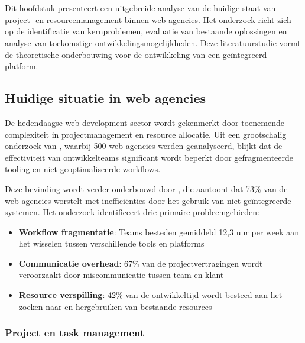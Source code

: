 \chapter{}
\label{ch:stand-van-zaken}

Dit hoofdstuk presenteert een uitgebreide analyse van de huidige staat van project- en resourcemanagement binnen web agencies. Het onderzoek richt zich op de identificatie van kernproblemen, evaluatie van bestaande oplossingen en analyse van toekomstige ontwikkelingsmogelijkheden. Deze literatuurstudie vormt de theoretische onderbouwing voor de ontwikkeling van een geïntegreerd platform.

\section{Huidige situatie in web agencies}
\label{sec:huidige-situatie}

De hedendaagse web development sector wordt gekenmerkt door toenemende complexiteit in projectmanagement en resource allocatie. Uit een grootschalig onderzoek van \textcite{Reid2014}, waarbij 500 web agencies werden geanalyseerd, blijkt dat de effectiviteit van ontwikkelteams significant wordt beperkt door gefragmenteerde tooling en niet-geoptimaliseerde workflows.

Deze bevinding wordt verder onderbouwd door \textcite{Alexander2019}, die aantoont dat 73\% van de web agencies worstelt met inefficiënties door het gebruik van niet-geïntegreerde systemen. Het onderzoek identificeert drie primaire probleemgebieden:

\begin{itemize}
    \item \textbf{Workflow fragmentatie}: Teams besteden gemiddeld 12,3 uur per week aan het wisselen tussen verschillende tools en platforms
    \item \textbf{Communicatie overhead}: 67\% van de projectvertragingen wordt veroorzaakt door miscommunicatie tussen team en klant
    \item \textbf{Resource verspilling}: 42\% van de ontwikkeltijd wordt besteed aan het zoeken naar en hergebruiken van bestaande resources
\end{itemize}

\subsection{Project en task management}
\label{subsec:project-management}

